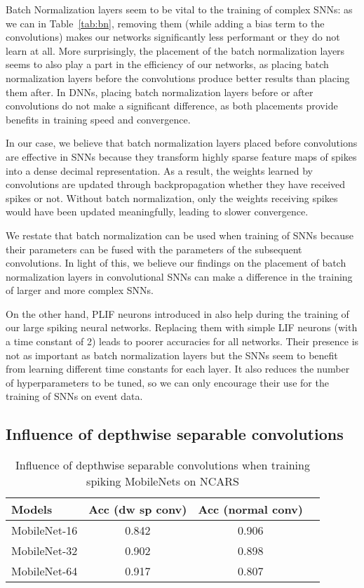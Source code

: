 \documentclass[conference]{IEEEtran}
\begin{document}
Batch Normalization layers seem to be vital to the training of complex SNNs: as we can in Table~\ref{tab:bn}, removing them (while adding a bias term to the convolutions) makes our networks significantly less performant or they do not learn at all. More surprisingly, the placement of the batch normalization layers seems to also play a part in the efficiency of our networks, as placing batch normalization layers before the convolutions produce better results than placing them after. In DNNs, placing batch normalization layers before or after convolutions do not make a significant difference, as both placements provide benefits in training speed and convergence.

In our case, we believe that batch normalization layers placed before convolutions are effective in SNNs because they transform highly sparse feature maps of spikes into a dense decimal representation. As a result, the weights learned by convolutions are updated through backpropagation whether they have received spikes or not. Without batch normalization, only the weights receiving spikes would have been updated meaningfully, leading to slower convergence.

We restate that batch normalization can be used when training of SNNs because their parameters can be fused with the parameters of the subsequent convolutions. In light of this, we believe our findings on the placement of batch normalization layers in convolutional SNNs can make a difference in the training of larger and more complex SNNs.

On the other hand, PLIF neurons introduced in \cite{plif} also help during the training of our large spiking neural networks. Replacing them with simple LIF neurons (with a time constant  of 2) leads to poorer accuracies for all networks.
Their presence is not as important as batch normalization layers but the SNNs seem to benefit from learning different time constants for each layer. It also reduces the number of hyperparameters to be tuned, so we can only encourage their use for the training of SNNs on event data.

\subsection{Influence of depthwise separable convolutions\label{dw}}

\begin{table}[]
\renewcommand{\arraystretch}{1.3}
\centering
\caption{Influence of depthwise separable convolutions when training spiking MobileNets on NCARS}
\begin{tabular}{lccc}
\hline
\textbf{Models}     & \textbf{Acc (dw sp conv)} & \textbf{Acc (normal conv)}  \\ \hline
MobileNet-16 & 0.842 & 0.906                       \\ 
MobileNet-32 & 0.902 & 0.898                      \\ 
MobileNet-64 & 0.917 & 0.807                \\ 
\hline
\end{tabular}
\label{tab:dwconv}
\end{table}
\end{document}
